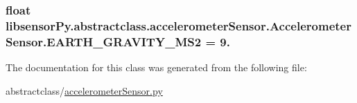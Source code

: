 \subsubsection[{E\+A\+R\+T\+H\+\_\+\+G\+R\+A\+V\+I\+T\+Y\+\_\+\+M\+S2}]{\setlength{\rightskip}{0pt plus 5cm}float libsensor\+Py.\+abstractclass.\+accelerometer\+Sensor.\+Accelerometer\+Sensor.\+E\+A\+R\+T\+H\+\_\+\+G\+R\+A\+V\+I\+T\+Y\+\_\+\+M\+S2 = 9.\hspace{0.3cm}{\ttfamily [static]}}\label{classlibsensorPy_1_1abstractclass_1_1accelerometerSensor_1_1AccelerometerSensor_a7446d06643573657d74bae7516f2162e}


The documentation for this class was generated from the following file\+:\begin{DoxyCompactItemize}
\item 
abstractclass/\hyperlink{abstractclass_2accelerometerSensor_8py}{accelerometer\+Sensor.\+py}\end{DoxyCompactItemize}

